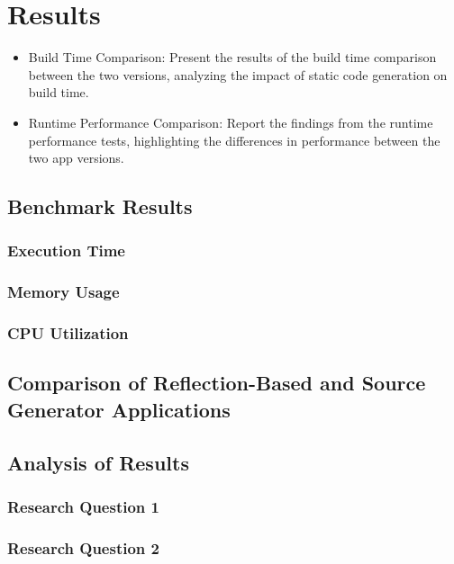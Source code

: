 \chapter{Results}
\begin{itemize}
    \item Build Time Comparison: Present the results of the build time comparison between the two versions, analyzing the impact of static code generation on build time.
    \item Runtime Performance Comparison: Report the findings from the runtime performance tests, highlighting the differences in performance between the two app versions.
\end{itemize}

\section{Benchmark Results}

\subsection{Execution Time}

\subsection{Memory Usage}

\subsection{CPU Utilization}

\section{Comparison of Reflection-Based and Source Generator Applications}

\section{Analysis of Results}

\subsection{Research Question 1}

\subsection{Research Question 2}
